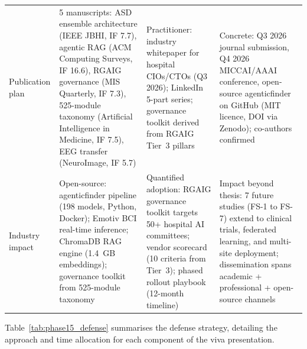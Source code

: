 \begin{xltabular}{\textwidth}{@{} l X X X @{}}
\addlinespace
Publication plan            & 5 manuscripts: ASD ensemble architecture (IEEE JBHI, IF 7.7), agentic RAG (ACM Computing Surveys, IF 16.6), RGAIG governance (MIS Quarterly, IF 7.3), 525-module taxonomy (Artificial Intelligence in Medicine, IF 7.5), EEG transfer (NeuroImage, IF 5.7) & Practitioner: industry whitepaper for hospital CIOs/CTOs (Q3 2026); LinkedIn 5-part series; governance toolkit derived from RGAIG Tier~3 pillars & Concrete: Q3 2026 journal submission, Q4 2026 MICCAI/AAAI conference, open-source agenticfinder on GitHub (MIT licence, DOI via Zenodo); co-authors confirmed \\
\addlinespace
Industry impact             & Open-source: agenticfinder pipeline (198 models, Python, Docker); Emotiv BCI real-time inference; ChromaDB RAG engine (1.4~GB embeddings); governance toolkit from 525-module taxonomy & Quantified adoption: RGAIG governance toolkit targets 50+ hospital AI committees; vendor scorecard (10 criteria from Tier~3); phased rollout playbook (12-month timeline) & Impact beyond thesis: 7 future studies (FS-1 to FS-7) extend to clinical trials, federated learning, and multi-site deployment; dissemination spans academic + professional + open-source channels \\
\end{xltabular}
\endgroup

\vspace{1.5em}

Table~\ref{tab:phase15_defense} summarises the defense strategy, detailing the approach and time allocation for each component of the viva presentation.

